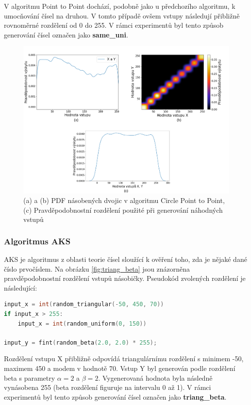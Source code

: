 V algoritmu Point to Point dochází, podobně jako u předchozího algoritmu, k umocňování čísel na druhou. V tomto případě ovšem vstupy následují přibližně rovnoměrné rozdělení od 0 do 255. V rámci experimentů byl tento způsob generování čísel označen jako \textbf{same\_uni}.

\begin{figure}[H]
    \centering
    \includegraphics[width=\textwidth]{obrazky-figures/same_uni.png}
    \caption{(a) a (b) PDF násobených dvojic v algoritmu Circle Point to Point, (c) Pravděpodobnostní rozdělení použité při generování náhodných vstupů}
    \label{fig:same_uni}
\end{figure}

\pagebreak

\subsubsection{Algoritmus AKS}
AKS je algoritmus z oblasti teorie čísel sloužící k ověření toho, zda je nějaké dané číslo prvočíslem. Na obrázku \ref{fig:triang_beta} jsou znázorněna pravděpodobnostní rozdělení vstupů násobičky. Pseudokód zvolených rozdělení je následující:

\begin{lstlisting}[language={C}, label={lst:aks}]
input_x = int(random_triangular(-50, 450, 70))
if input_x > 255:
    input_x = int(random_uniform(0, 150))

input_y = fint(random_beta(2.0, 2.0) * 255);
\end{lstlisting}

Rozdělení vstupu X přibližně odpovídá triangulárnímu rozdělení s minimem -50, maximem 450 a modem v hodnotě 70. Vstup Y byl generován podle rozdělení beta s parametry $\alpha = 2$ a $\beta = 2$. Vygenerovaná hodnota byla následně vynásobena 255 (beta rozdělení figuruje na intervalu 0 až 1). V rámci experimentů byl tento způsob generování čísel označen jako \textbf{triang\_beta}.

